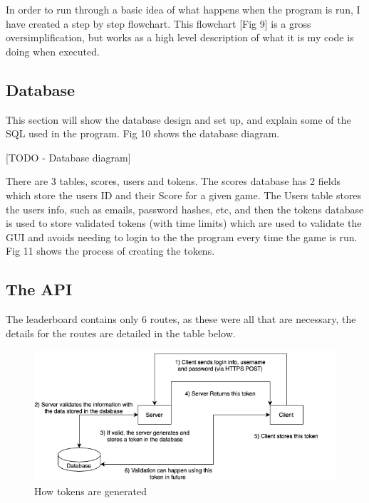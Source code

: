 \documentclass{article}
\begin{document}
In order to run through a basic idea of what happens when the program is run, I have created a step by step flowchart. This flowchart [Fig 9] is a gross oversimplification, but works as a high level description of what it is my code is doing when executed.

\subsection{Database}
This section will show the database design and set up, and explain some of the SQL used in the program. Fig 10 shows the database diagram.


[TODO - Database diagram]


There are 3 tables, scores, users and tokens. The scores database has 2 fields which store the users ID and their Score for a given game. The Users table stores the users info, such as emails, password hashes, etc, and then the tokens database is used to store validated tokens (with time limits) which are used to validate the GUI and avoids needing to login to the the program every time the game is run. Fig 11 shows the process of creating the tokens.

\subsection{The API}
The leaderboard contains only 6 routes, as these were all that are necessary, the details for the routes are detailed in the table below.

\begin{figure}[h!]
  \includegraphics[width=0.8\linewidth]{tokens.png}
  \centering
  \caption{How tokens are generated}
  \label{fig:tokens}
\end{figure}
\end{document}
